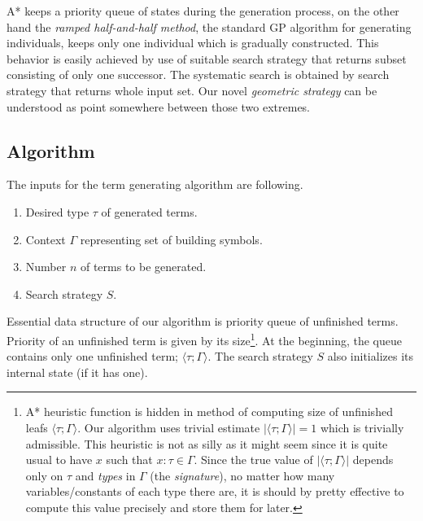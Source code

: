 \documentclass[conference]{IEEEtran}
\newcommand{\ul}[2]{\langle #1 ; #2 \rangle}
\begin{document}
A* keeps a priority queue of states during the generation process,
on the other hand the \textit{ramped half-and-half method}, 
the standard GP algorithm for generating individuals, 
keeps only one individual which is gradually constructed. This 
behavior is easily achieved by use of suitable search strategy 
that returns subset consisting of only one successor.
The systematic search is obtained by search strategy that 
returns whole input set.      
Our novel \textit{geometric strategy} can be understood as
point somewhere between those two extremes.

\subsection{Algorithm}

The inputs for the term generating algorithm are following.
\begin{enumerate}
 \item Desired type $\tau$ of generated terms.
 \item Context $\Gamma$ representing set of building symbols.
 \item Number $n$ of terms to be generated.
 \item Search strategy $S$. 
\end{enumerate}

Essential data structure of our algorithm 
is priority queue of unfinished terms. 
Priority of an unfinished term is given by its size\footnote{
A* heuristic function is hidden in method of computing
size of unfinished leafs $\ul{\tau}{\Gamma}$. Our algorithm uses
trivial estimate $\vert\ul{\tau}{\Gamma}\vert = 1$ which is trivially admissible.
This heuristic is not as silly as it might seem since it is
quite usual to have $x$ such that $x : \tau \in \Gamma$.
Since the true value of $\vert\ul{\tau}{\Gamma}\vert$ depends only on
$\tau$ and \textit{types} in $\Gamma$ (the \textit{signature}), 
no matter how many variables/constants of
each type there are, it is should by pretty effective to compute this
value precisely and store them for later. 
}.
At the beginning, the queue contains only one unfinished term; 
$\ul{\tau}{\Gamma}$. The search strategy $S$ also 
initializes its internal state (if it has one).
\end{document}
